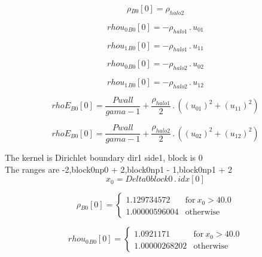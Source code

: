 \documentclass{article}
\begin{document}
\begin{dmath}{\rho{_{B0}}}[{0}] = \rho_{halo 2}\end{dmath}

\begin{dmath}{rhou_{0}{_{B0}}}[{0}] = - \rho_{halo 1} \,.\, u_{01}\end{dmath}

\begin{dmath}{rhou_{1}{_{B0}}}[{0}] = - \rho_{halo 1} \,.\, u_{11}\end{dmath}

\begin{dmath}{rhou_{0}{_{B0}}}[{0}] = - \rho_{halo 2} \,.\, u_{02}\end{dmath}

\begin{dmath}{rhou_{1}{_{B0}}}[{0}] = - \rho_{halo 2} \,.\, u_{12}\end{dmath}

\begin{dmath}{rhoE{_{B0}}}[{0}] = \frac{Pwall}{gama - 1} + \frac{\rho_{halo 1}}{2} \,.\, \left(\left(u_{01} \right)^{2} + \left(u_{11} \right)^{2}\right)\end{dmath}

\begin{dmath}{rhoE{_{B0}}}[{0}] = \frac{Pwall}{gama - 1} + \frac{\rho_{halo 2}}{2} \,.\, \left(\left(u_{02} \right)^{2} + \left(u_{12} \right)^{2}\right)\end{dmath}

\noindent The kernel is Dirichlet boundary dir1 side1, block is 0\\\noindent The ranges are -2,block0np0 + 2,block0np1 - 1,block0np1 + 2\\\begin{dmath}x_{0} = Delta0block0 \,.\, {idx}[{0}]\end{dmath}

\begin{dmath}{\rho{_{B0}}}[{0}] = \begin{cases} 1.129734572 & \text{for}\: x_{0} > 40.0 \\1.00000596004 & \text{otherwise} \end{cases}\end{dmath}

\begin{dmath}{rhou_{0}{_{B0}}}[{0}] = \begin{cases} 1.0921171 & \text{for}\: x_{0} > 40.0 \\1.00000268202 & \text{otherwise} \end{cases}\end{dmath}
\end{document}

